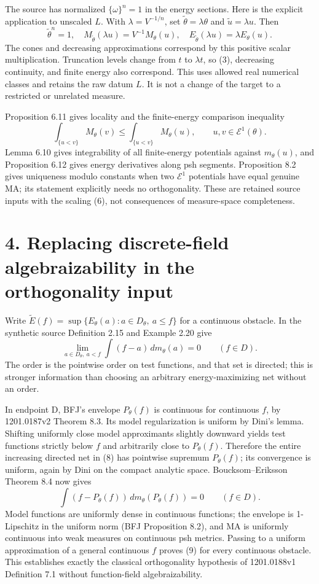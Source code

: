 \documentclass[11pt]{article}
\begin{document}
The source has normalized \(\{\omega\}^n=1\) in the energy sections. Here is the explicit application to unscaled \(L\). With \(\lambda=V^{-1/n}\), set \(\widetilde\theta=\lambda\theta\) and \(\widetilde u=\lambda u\). Then
\[
 \widetilde\theta^n=1,\quad
 M_{\widetilde\theta}(\lambda u)=V^{-1}M_\theta(u),\quad
 E_{\widetilde\theta}(\lambda u)=\lambda E_\theta(u).
 \tag{6}
\]
The cones and decreasing approximations correspond by this positive scalar multiplication. Truncation levels change from \(t\) to \(\lambda t\), so (3), decreasing continuity, and finite energy also correspond. This uses allowed real numerical classes and retains the raw datum \(L\). It is not a change of the target to a restricted or unrelated measure.

Proposition 6.11 gives locality and the finite-energy comparison inequality
\[
 \int_{\{u<v\}}M_\theta(v)\leq
 \int_{\{u<v\}}M_\theta(u),\qquad u,v\in\mathcal E^1(\theta).
 \tag{7}
\]
Lemma 6.10 gives integrability of all finite-energy potentials against \(m_\theta(u)\), and Proposition 6.12 gives energy derivatives along psh segments. Proposition 8.2 gives uniqueness modulo constants when two \(\mathcal E^1\) potentials have equal genuine MA; its statement explicitly needs no orthogonality. These are retained source inputs with the scaling (6), not consequences of measure-space completeness.

\section*{4. Replacing discrete-field algebraizability in the orthogonality input}

Write \(\widetilde E(f)=\sup\{E_\theta(a):a\in D_\theta,\ a\leq f\}\) for a continuous obstacle. In the synthetic source Definition 2.15 and Example 2.20 give
\[
 \lim_{a\in D_\theta,\ a<f}\int(f-a)\,dm_\theta(a)=0
 \qquad(f\in D).
 \tag{8}
\]
The order is the pointwise order on test functions, and that set is directed; this is stronger information than choosing an arbitrary energy-maximizing net without an order.

In endpoint D, BFJ's envelope \(P_\theta(f)\) is continuous for continuous \(f\), by 1201.0187v2 Theorem 8.3. Its model regularization is uniform by Dini's lemma. Shifting uniformly close model approximants slightly downward yields test functions strictly below \(f\) and arbitrarily close to \(P_\theta(f)\). Therefore the entire increasing directed net in (8) has pointwise supremum \(P_\theta(f)\); its convergence is uniform, again by Dini on the compact analytic space. Boucksom--Eriksson Theorem 8.4 now gives
\[
 \int(f-P_\theta(f))\,dm_\theta(P_\theta(f))=0
 \qquad(f\in D).
 \tag{9}
\]
Model functions are uniformly dense in continuous functions; the envelope is 1-Lipschitz in the uniform norm (BFJ Proposition 8.2), and MA is uniformly continuous into weak measures on continuous psh metrics. Passing to a uniform approximation of a general continuous \(f\) proves (9) for every continuous obstacle. This establishes exactly the classical orthogonality hypothesis of 1201.0188v1 Definition 7.1 without function-field algebraizability.
\end{document}
